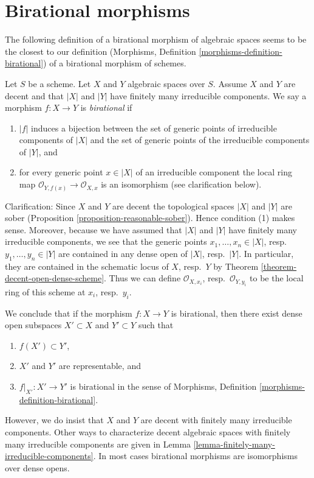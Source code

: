 \section{Birational morphisms}
\label{section-birational}

\noindent
The following definition of a birational morphism of algebraic spaces
seems to be the closest to our definition
(Morphisms, Definition \ref{morphisms-definition-birational})
of a birational morphism of schemes.

\begin{definition}
\label{definition-birational}
Let $S$ be a scheme. Let $X$ and $Y$ algebraic spaces over $S$.
Assume $X$ and $Y$ are decent and that $|X|$ and $|Y|$ have finitely many
irreducible components. We say a morphism $f : X \to Y$ is
{\it birational} if
\begin{enumerate}
\item $|f|$ induces a bijection between the set of generic points
of irreducible components of $|X|$ and the set of generic points
of the irreducible components of $|Y|$, and
\item for every generic point $x \in |X|$ of an irreducible component
the local ring map $\mathcal{O}_{Y, f(x)} \to \mathcal{O}_{X, x}$
is an isomorphism (see clarification below).
\end{enumerate}
\end{definition}

\noindent
Clarification: Since $X$ and $Y$ are decent the topological spaces
$|X|$ and $|Y|$ are sober (Proposition \ref{proposition-reasonable-sober}).
Hence condition (1) makes sense. Moreover, because we have assumed
that $|X|$ and $|Y|$ have finitely many irreducible components, we
see that the generic points $x_1, \ldots, x_n \in |X|$,
resp.\ $y_1, \ldots, y_n \in |Y|$ are contained in any dense open
of $|X|$, resp.\ $|Y|$. In particular, they are contained in
the schematic locus of $X$, resp.\ $Y$ by
Theorem \ref{theorem-decent-open-dense-scheme}.
Thus we can define $\mathcal{O}_{X, x_i}$, resp.\ $\mathcal{O}_{Y, y_i}$
to be the local ring of this scheme at $x_i$, resp.\ $y_i$.

\medskip\noindent
We conclude that if the morphism $f : X \to Y$ is birational, then
there exist dense open subspaces $X' \subset X$ and $Y' \subset Y$ such that
\begin{enumerate}
\item $f(X') \subset Y'$,
\item $X'$ and $Y'$ are representable, and
\item $f|_{X'} : X' \to Y'$ is birational in
the sense of Morphisms, Definition \ref{morphisms-definition-birational}.
\end{enumerate}
However, we do insist that $X$ and $Y$ are decent with finitely many
irreducible components. Other ways to characterize decent algebraic spaces
with finitely many irreducible components
are given in Lemma \ref{lemma-finitely-many-irreducible-components}.
In most cases birational morphisms are isomorphisms over dense opens.


